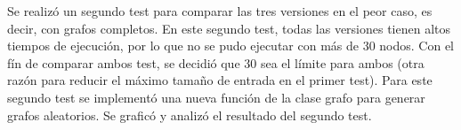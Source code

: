 \documentclass[10pt,a4paper]{article}
\begin{document}
\par{Se realizó un segundo test para comparar las tres versiones en el peor
caso, es decir, con grafos completos. En este segundo test, todas las
versiones tienen altos tiempos de ejecución, por lo que no se pudo
ejecutar con más de 30 nodos. Con el fín de comparar ambos test, se decidió
que 30 sea el límite para ambos (otra razón para reducir el máximo tamaño
de entrada en el primer test). Para este segundo test se implementó una
nueva función de la clase grafo para generar grafos aleatorios. Se graficó
y analizó el resultado del segundo test.}
\end{document}
